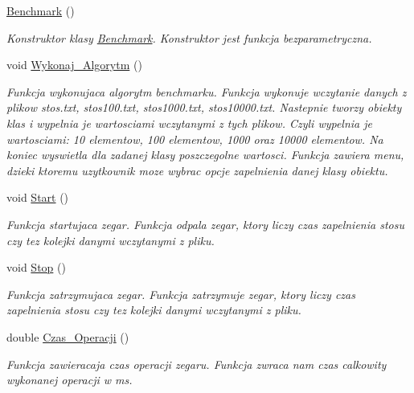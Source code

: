 \begin{DoxyCompactItemize}
\item 
\hyperlink{class_benchmark_acfca497989836a688d44477802e822d8}{\-Benchmark} ()
\begin{DoxyCompactList}\small\item\em \-Konstruktor klasy \hyperlink{class_benchmark}{\-Benchmark}. \-Konstruktor jest funkcja bezparametryczna. \end{DoxyCompactList}\item 
void \hyperlink{class_benchmark_aec505cc255177517a37e06e3b49f5911}{\-Wykonaj\-\_\-\-Algorytm} ()
\begin{DoxyCompactList}\small\item\em \-Funkcja wykonujaca algorytm benchmarku. \-Funkcja wykonuje wczytanie danych z plikow stos.\-txt, stos100.\-txt, stos1000.\-txt, stos10000.\-txt. \-Nastepnie tworzy obiekty klas i wypelnia je wartosciami wczytanymi z tych plikow. \-Czyli wypelnia je wartosciami\-: 10 elementow, 100 elementow, 1000 oraz 10000 elementow. \-Na koniec wyswietla dla zadanej klasy poszczegolne wartosci. \-Funkcja zawiera menu, dzieki ktoremu uzytkownik moze wybrac opcje zapelnienia danej klasy obiektu. \end{DoxyCompactList}\item 
void \hyperlink{class_benchmark_ac55ca7809108ed22a644d6d41071d187}{\-Start} ()
\begin{DoxyCompactList}\small\item\em \-Funkcja startujaca zegar. \-Funkcja odpala zegar, ktory liczy czas zapelnienia stosu czy tez kolejki danymi wczytanymi z pliku. \end{DoxyCompactList}\item 
void \hyperlink{class_benchmark_aa3ca94f8984beb0ecbfa77d50cbe5c3a}{\-Stop} ()
\begin{DoxyCompactList}\small\item\em \-Funkcja zatrzymujaca zegar. \-Funkcja zatrzymuje zegar, ktory liczy czas zapelnienia stosu czy tez kolejki danymi wczytanymi z pliku. \end{DoxyCompactList}\item 
double \hyperlink{class_benchmark_aee4890492aa777816da1d63fa7a8c4c2}{\-Czas\-\_\-\-Operacji} ()
\begin{DoxyCompactList}\small\item\em \-Funkcja zawieracaja czas operacji zegaru. \-Funkcja zwraca nam czas calkowity wykonanej operacji w ms. \end{DoxyCompactList}\end{DoxyCompactItemize}
